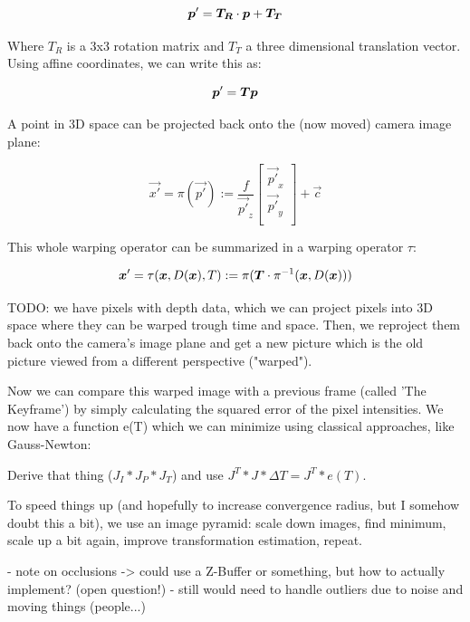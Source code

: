 \begin{equation}
    \vec{p'} = \mat{T_R} \cdot \vec{p} + \vec{T_T}
\end{equation}

Where $T_R$ is a 3x3 rotation matrix and $T_T$ a three dimensional translation
vector. Using affine coordinates, we can write this as:

\begin{equation}
    \vec{p'} = \mat{T} \vec{p}
\end{equation}

A point in 3D space can be projected back onto the (now moved) camera image plane:

\begin{equation}
    \vec{x'} = \pi(\vec{p'}) := \frac{f}{\vec{p'}_z}
    \begin{bmatrix}
        \vec{p'}_x \\
        \vec{p'}_y \\
    \end{bmatrix}
    + \vec{c}
\end{equation}

This whole warping operator can be summarized in a warping operator $\tau$:

\begin{equation}
    \vec{x'} = \tau(\vec{x}, D(\vec{x}), T) := \pi( \mat{T} \cdot \pi^{-1} (\vec{x}, D(\vec{x})))
\end{equation}



TODO:
we have pixels with depth data, which we can project pixels into 3D space where
they can be warped trough time and space. Then, we reproject them back onto the
camera's image plane and get a new picture which is the old picture viewed from
a different perspective ("warped").

Now we can compare this warped image with a previous frame (called 'The
Keyframe') by simply calculating the squared error of the pixel intensities. We
now have a function e(T) which we can minimize using classical approaches, like
Gauss-Newton:

Derive that thing ($ J_I * J_P * J_T $) and use $J^T*J*\Delta T = J^T*e(T)$.

To speed things up (and hopefully to increase convergence radius, but I somehow
doubt this a bit), we use an image pyramid: scale down images, find minimum,
scale up a bit again, improve transformation estimation, repeat.

- note on occlusions -> could use a Z-Buffer or something, but how to actually implement? (open question!)
- still would need to handle outliers due to noise and moving things (people...)




